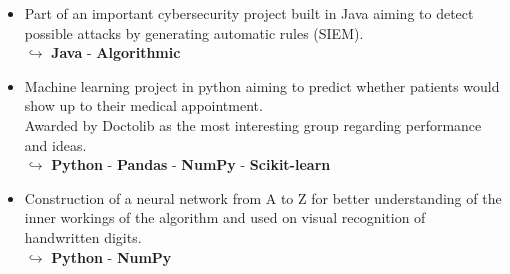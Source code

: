 \documentclass[9pt,a4paper,ragged2e]{altacv}
\begin{document}



\divider
{}
\begin{itemize}
	\item Part of an important cybersecurity project built in Java aiming to detect possible attacks by generating automatic rules (SIEM).\\
  $\hookrightarrow$ \textbf{Java} - \textbf{Algorithmic}
\end{itemize}
\begin{itemize}
	\item Machine learning project in python aiming to predict whether patients would show up to their medical appointment. \\Awarded by Doctolib as the most interesting group regarding performance and ideas.\\
  $\hookrightarrow$ \textbf{Python} - \textbf{Pandas} - \textbf{NumPy} - \textbf{Scikit-learn}
\end{itemize}
\begin{itemize}
	\item Construction of a neural network from A to Z for better understanding of the inner workings of the algorithm and used on visual recognition of \\handwritten digits. \\
  $\hookrightarrow$ \textbf{Python} - \textbf{NumPy}
\end{itemize}
\end{document}
